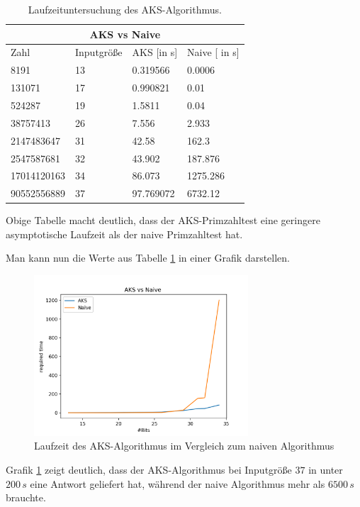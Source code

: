 \documentclass[12pt,oneside]{article}
\theoremstyle{remark}
\theoremstyle{definition}
\begin{document}
\begin{table}[h!]
\centering
\begin{tabular}{ |p{3cm}||p{3cm}|p{3cm}|p{3cm}|  }
 \hline
 \multicolumn{4}{|c|}{AKS vs Naive} \\
 \hline
 Zahl & Inputgröße  & AKS [in s] &Naive [ in s]\\
 \hline
 8191   & 13    &0.319566&   0.0006\\
 131071&   17  & 0.990821   &0.01\\
 524287 &19 &  1.5811& 0.04\\
 38757413    &26 & 7.556&   2.933\\
 2147483647& 31  & 42.58   &162.3\\
 2547587681& 32  &  43.902&  187.876\\
 17014120163&   34  & 86.073& 1275.286\\
 90552556889&   37  & 97.769072& 6732.12\\

 \hline
\end{tabular}
 \caption{Laufzeituntersuchung des AKS-Algorithmus.}
\label{table:4}
\end{table}

Obige Tabelle macht deutlich, dass der AKS-Primzahltest eine geringere asymptotische Laufzeit als der naive Primzahltest hat.

Man kann nun die Werte aus Tabelle \ref{table:4} in einer Grafik darstellen. 

\begin{figure}[h]
\includegraphics[width=8cm]{plots/aksVsNaive.png}
\centering
\caption{Laufzeit des AKS-Algorithmus im Vergleich zum naiven Algorithmus}
\label{plot_aks_naive}
\end{figure}

Grafik \ref{plot_aks_naive} zeigt deutlich, dass der AKS-Algorithmus bei Inputgröße $37$ in unter $200 \, s$ eine Antwort geliefert hat, während der naive Algorithmus mehr als $6500 \, s$ brauchte.
\end{document}
